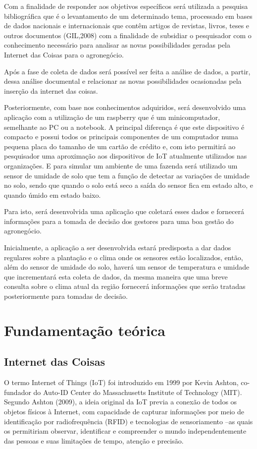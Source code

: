 \documentclass[eso]{bcc}
\begin{document}
Com a finalidade de responder aos objetivos específicos será utilizada a pesquisa bibliográfica 
que é o levantamento de um determinado tema, processado em bases de dados nacionais e internacionais 
que contêm artigos de revistas, livros, teses e outros documentos (GIL,2008) com a finalidade de 
subsidiar o pesquisador com o conhecimento necessário para analisar as novas possibilidades geradas 
pela Internet das Coisas para o agronegócio.

Após a fase de coleta de dados será possível ser feita a análise de dados, a partir, dessa análise 
documental e relacionar as novas possibilidades ocasionadas pela inserção da internet das coisas.

Posteriormente, com base nos conhecimentos adquiridos, será desenvolvido uma aplicação com a 
utilização de um raspberry que é um minicomputador, semelhante ao PC ou a notebook. A principal 
diferença é que este dispositivo é compacto e possui todos os principais componentes de um 
computador numa pequena placa do tamanho de um cartão de crédito e, com isto permitirá ao 
pesquisador uma aproximação aos dispositivos de IoT atualmente utilizados nas organizações. 
E para simular um ambiente de uma fazenda será utilizado um sensor de umidade de solo que tem 
a função de detectar as variações de umidade no solo, sendo que quando o solo está seco a saída 
do sensor fica em estado alto, e quando úmido em estado baixo.

Para isto, será desenvolvida uma aplicação que coletará esses dados e fornecerá informações para 
a tomada de decisão dos gestores para uma boa gestão do agronegócio.

Inicialmente, a aplicação a ser desenvolvida estará predisposta a dar dados regulares sobre a 
plantação e o clima onde os sensores estão localizados, então, além do sensor de umidade do solo, 
haverá um sensor de temperatura e umidade que incrementará esta coleta de dados, da mesma maneira 
que uma breve consulta sobre o clima atual da região fornecerá informações que serão tratadas 
posteriormente para tomadas de decisão.

\chapter{Fundamentação teórica}\label{chap:fundamentacao}

\section{Internet das Coisas}
O termo Internet of Things (IoT) foi introduzido em 1999 por Kevin Ashton, 
co-fundador do Auto-ID Center do Massachusetts Institute of Technology (MIT). 
Segundo Ashton (2009), a ideia original da IoT previa a conexão de todos os objetos 
físicos à Internet, com capacidade de capturar informações por meio de identificação 
por radiofrequência (RFID) e tecnologias de sensoriamento –as quais os permitiriam observar, 
identificar e compreender o mundo independentemente das pessoas e suas limitações de tempo, 
atenção e precisão.
\end{document}
